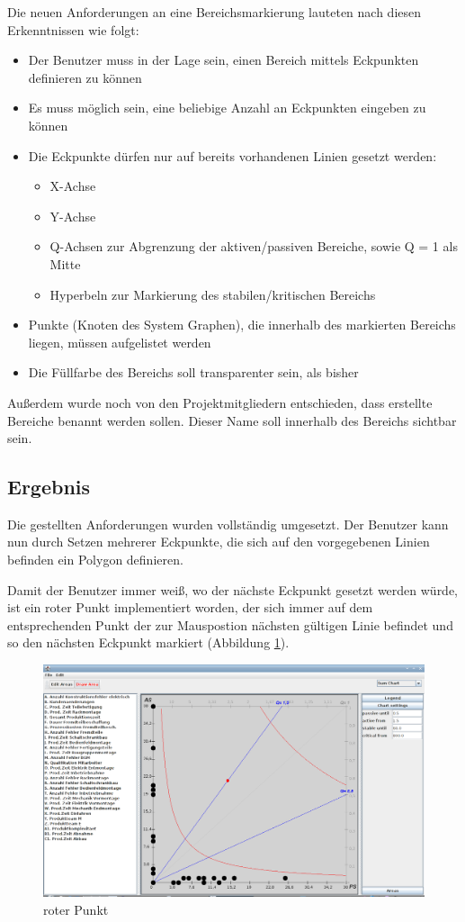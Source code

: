 Die neuen Anforderungen an eine Bereichsmarkierung lauteten nach diesen Erkenntnissen wie folgt:
\begin{itemize}
  \item Der Benutzer muss in der Lage sein, einen Bereich mittels Eckpunkten definieren zu können
  \item Es muss möglich sein, eine beliebige Anzahl an Eckpunkten eingeben zu können
  \item Die Eckpunkte dürfen nur auf bereits vorhandenen Linien gesetzt werden:
  \begin{itemize}
    \item X-Achse
    \item Y-Achse
    \item Q-Achsen zur Abgrenzung der aktiven/passiven Bereiche, sowie Q = 1 als Mitte
    \item Hyperbeln zur Markierung des stabilen/kritischen Bereichs
  \end{itemize}
  \item Punkte (Knoten des System Graphen), die innerhalb des markierten Bereichs liegen, müssen aufgelistet werden
  \item Die Füllfarbe des Bereichs soll transparenter sein, als bisher
\end{itemize}

Außerdem wurde noch von den Projektmitgliedern entschieden, dass erstellte Bereiche benannt werden sollen. Dieser Name soll innerhalb des Bereichs sichtbar sein.

\subsection{Ergebnis}

Die gestellten Anforderungen wurden vollständig umgesetzt. Der Benutzer kann nun durch Setzen mehrerer Eckpunkte, die sich auf den vorgegebenen Linien befinden ein Polygon definieren.

Damit der Benutzer immer weiß, wo der nächste Eckpunkt gesetzt werden würde, ist ein roter Punkt implementiert worden, der sich immer auf dem entsprechenden Punkt der zur Mauspostion nächsten gültigen Linie befindet und so den nächsten Eckpunkt markiert (Abbildung \ref{roterPunkt}).
\begin{figure}
	\centering
	\includegraphics[width=1\textwidth]{pictures/roter-punkt.png}
	\caption{roter Punkt}
	\label{roterPunkt}
\end{figure}

